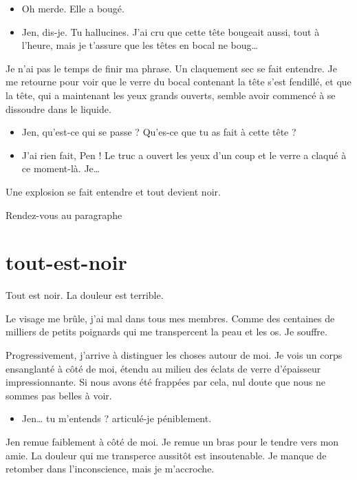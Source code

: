 \begin{itemize}
\item Oh merde. Elle a bougé.
\item Jen, dis-je. Tu hallucines. J'ai cru que cette tête bougeait aussi, tout à l'heure, mais je t'assure que les têtes en bocal ne boug…
\end{itemize}

Je n'ai pas le temps de finir ma phrase. Un claquement sec se fait entendre. Je me retourne pour voir que le verre du bocal contenant la tête s'est fendillé, et que la tête, qui a maintenant les yeux grands ouverts, semble avoir commencé à se dissoudre dans le liquide.

\begin{itemize}
\item Jen, qu'est-ce qui se passe ? Qu'es-ce que tu as fait à cette tête ?
\item J'ai rien fait, Pen ! Le truc a ouvert les yeux d'un coup et le verre a claqué à ce moment-là. Je…
\end{itemize}

Une explosion se fait entendre et tout devient noir.

\item Rendez-vous au paragraphe 
\enw

\section{tout-est-noir}

Tout est noir. La douleur est terrible.

Le visage me brûle, j'ai mal dans tous mes membres. Comme des centaines de milliers de petits poignards qui me transpercent la peau et les os. Je souffre.

Progressivement, j'arrive à distinguer les choses autour de moi. Je vois un corps ensanglanté à côté de moi, étendu au milieu des éclats de verre d'épaisseur impressionnante. Si nous avons été frappées par cela, nul doute que nous ne sommes pas belles à voir.

\begin{itemize}
\item Jen… tu m'entends ? articulé-je péniblement.
\end{itemize}

Jen remue faiblement à côté de moi. Je remue un bras pour le tendre vers mon amie. La douleur qui me transperce aussitôt est insoutenable. Je manque de retomber dans l'inconscience, mais je m'accroche.

